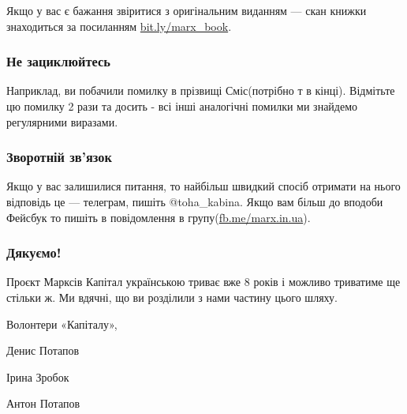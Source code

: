 \documentclass{kapital}
\begin{document}
{  \noindent{}Якщо у вас є бажання звіритися з оригінальним виданням — 
  скан книжки знаходиться за посиланням \underline{bit.ly/marx\_book}.

  \subsubsection*{Не зациклюйтесь}

  Наприклад, ви побачили помилку в прізвищі Сміс(потрібно т в кінці).
  Відмітьте цю помилку 2 рази та досить - всі інші аналогічні помилки ми знайдемо
  регулярними виразами.

  \subsubsection*{Зворотній зв'язок}


  Якщо у вас залишилися питання, то найбільш швидкий спосіб отримати 
  на нього відповідь це — телеграм, пишіть @toha\_kabina. Якщо вам 
  більш до вподоби Фейсбук то пишіть в повідомлення в 
  групу(\underline{fb.me/marx.in.ua}).

  \subsubsection*{Дякуємо!}

  Проєкт Марксів Капітал українською триває вже 8 років і можливо триватиме ще стільки ж. Ми вдячні, що ви
  розділили з нами частину цього шляху.
  
  \bigskip{}

  \noindent{}Волонтери «Капіталу»,

  \medskip{}

  \noindent{}Денис Потапов

  \noindent{}Ірина Зробок

  \noindent{}Антон Потапов
}
\end{document}

